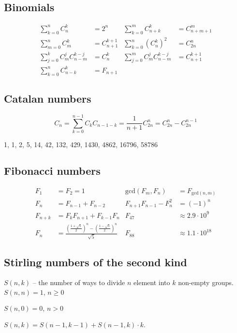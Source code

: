 \subsection*{Binomials}
\begin{align*}
\sum_{k = 0}^{n} C_n^k &= 2^n &
\sum_{k = 0}^{m} C_{n + k}^k &= C_{n + m + 1}^m \\
\sum_{m = 0}^{n} C_m^k &= C_{n + 1}^{k + 1} &
\sum_{k = 0}^{n} (C_n^k)^2 &= C_{2n}^n \\
\sum_{j = 0}^{k} C_m^j C_{n-m}^{k - j} &= C_n^k &
\sum_{j = 0}^{m} C_m^j C_{n-m}^{k - j} &= C_{n + 1}^{k + 1} \\
\sum_{k = 0}^{n} C_{n - k}^k &= F_{n + 1} &&
\end{align*}

\subsection*{Catalan numbers}
$$C_n = \sum_{k = 0}^{n - 1} C_kC_{n - 1 - k} = \frac{1}{n + 1} C_{2n}^{n} = C_{2n}^{n} - C_{2n}^{n - 1}$$

1, 1, 2, 5, 14, 42, 132, 429, 1430, 4862, 16796, 58786


\subsection*{Fibonacci numbers}
\begin{align*}
F_1 &= F_2 = 1 &
\text{gcd}(F_m, F_n) &= F_{\text{gcd}(n, m)} \\
F_n &= F_{n - 1} + F_{n - 2} &
F_{n + 1} F_{n - 1} - F_n^2 &= (-1)^n \\
F_{n + k} &= F_k F_{n + 1} + F_{k - 1} F_n &
F_{47} &\approx 2.9 \cdot 10^9\\
F_n &= \frac{(\tfrac{1 + \sqrt{5}}{2})^n - (\tfrac{1 - \sqrt{5}}{2})^n}{\sqrt{5}} &
F_{88} &\approx 1.1 \cdot 10^{18}
\end{align*}

\subsection*{Stirling numbers of the second kind}

$S(n, k)$ – the number of ways to divide $n$ element into $k$ non-empty groups.\\

$S(n, n) = 1$, $n \ge 0$

$S(n, 0) = 0$, $n > 0$

$S(n, k) = S(n - 1, k - 1) + S(n - 1, k) \cdot k$.

